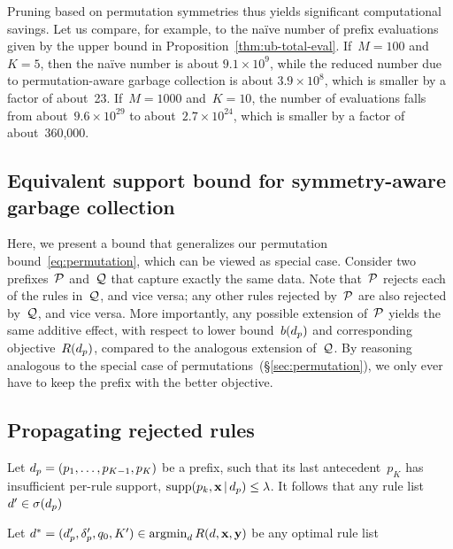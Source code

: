 Pruning based on permutation symmetries thus yields significant
computational savings.
%
Let us compare, for example, to the na\"ive number of prefix evaluations
given by the upper bound in Proposition~\ref{thm:ub-total-eval}.
%
If~${M = 100}$ and~${K = 5}$, then the na\"ive number is about
${9.1 \times 10^9}$, while the reduced number due to permutation-aware
garbage collection is about ${3.9 \times 10^8}$,
which is smaller by a factor of about~23.
%
If~${M=1000}$ and~${K = 10}$, the number of evaluations falls from
about~${9.6 \times 10^{29}}$ to about~${2.7 \times 10^{24}}$,
which is smaller by a factor of about~360,000.
%

\subsection{Equivalent support bound for symmetry-aware garbage collection}

Here, we present a bound that generalizes our permutation bound~\eqref{eq:permutation},
which can be viewed as special case.
%
Consider two prefixes~$\cal P$ and~$\cal Q$ that capture exactly the same data.
%
Note that~$\cal P$ rejects each of the rules in~$\cal Q$, and vice versa;
any other rules rejected by~$\cal P$ are also rejected by~$\cal Q$, and vice versa.
%
More importantly, any possible extension of~$\cal P$ yields the same additive effect,
with respect to lower bound~$b(d_p)$ and corresponding objective~$R(d_p)$,
compared to the analogous extension of~$\cal Q$.
%
By reasoning analogous to the special case of permutations~(\S\ref{sec:permutation}),
we only ever have to keep the prefix with the better objective.

\subsection{Propagating rejected rules}
\begin{corollary}
Let ${d_p = (p_1, \dots, p_{K-1}, p_K)}$ be a prefix, such that
its last antecedent~$p_K$ has insufficient per-rule support,
\ie ${\textnormal{supp}(p_k, \mathbf{x} \,|\, d_p) \le {\lambda}}$.
%
It follows that any rule list ${{d}' \in \sigma(d_p)}$

Let ${{d}^* = (d_p', \delta_p', q_0, K') \in \operatorname*{argmin}_{d} R({d}, \mathbf{x}, \mathbf{y})}$ be any optimal
rule list

\end{corollary}

